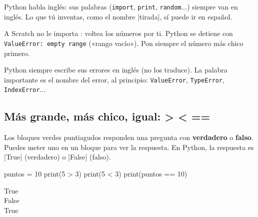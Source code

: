 Python habla inglés: sus palabras (\texttt{import}, \texttt{print}, \texttt{random}...) siempre van en inglés. Lo que tú inventas, como el nombre \py|tirada|, sí puede ir en español.

\begin{watchout}
A Scratch no le importa : voltea los números por ti. Python se detiene con \texttt{ValueError: empty range} («rango vacío»). Pon siempre el número más chico primero.

Python siempre escribe sus errores en inglés (no los traduce). La palabra importante es el nombre del error, al principio: \texttt{ValueError}, \texttt{TypeError}, \texttt{IndexError}...
\end{watchout}

\subsection*{Más grande, más chico, igual: > < ==}

Los bloques verdes puntiagudos responden una pregunta con \textbf{verdadero} o \textbf{falso}. Puedes meter uno en un bloque  para ver la respuesta. En Python, la respuesta es \py|True| (verdadero) o \py|False| (falso).

\begin{tcbraster}[raster columns=2, raster equal height=rows, raster column skip=12pt, raster valign=center, raster force size=false, raster odd column/.style={add to width=-1.2cm}, raster even column/.style={add to width=1.2cm}]
\begin{tcolorbox}[colback=white, colframe=white, boxrule=0pt, valign=center]
\begin{scratch}[scale=0.77]
\end{scratch}
\end{tcolorbox}
\begin{tcolorbox}[colback=white, colframe=white, boxrule=0pt, left=0pt, right=0pt, top=0pt, bottom=0pt, valign=center]
\begin{code}
puntos = 10
print(5 > 3)
print(5 < 3)
print(puntos == 10)
\end{code}
\begin{outputbox}
True\\
False\\
True
\end{outputbox}
\end{tcolorbox}
\end{tcbraster}

